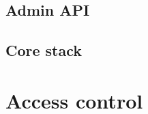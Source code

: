 \documentclass[runningheads,a4paper]{article}
\begin{document}
\subsection{Admin API}

\subsection{Core stack}


\section{Access control}



\end{document}
